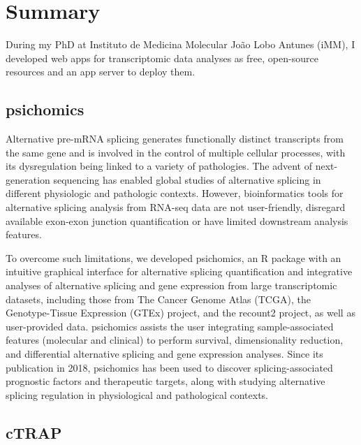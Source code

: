 \chapter*{Summary}

During my PhD at Instituto de Medicina Molecular João Lobo Antunes (iMM), I developed web apps for transcriptomic data analyses as free, open-source resources and an app server to deploy them.

\section*{psichomics}

Alternative pre-mRNA splicing generates functionally distinct transcripts from the same gene and is involved in the control of multiple cellular processes, with its dysregulation being linked to a variety of pathologies. The advent of next-generation sequencing has enabled global studies of alternative splicing in different physiologic and pathologic contexts. However, bioinformatics tools for alternative splicing analysis from RNA-seq data are not user-friendly, disregard available exon-exon junction quantification or have limited downstream analysis features.

To overcome such limitations, we developed psichomics, an R package with an intuitive graphical interface for alternative splicing quantification and integrative analyses of alternative splicing and gene expression from large transcriptomic datasets, including those from The Cancer Genome Atlas (TCGA), the Genotype-Tissue Expression (GTEx) project, and the recount2 project, as well as user-provided data. psichomics assists the user integrating sample-associated features (molecular and clinical) to perform survival, dimensionality reduction, and differential alternative splicing and gene expression analyses. Since its publication in 2018, psichomics has been used to discover splicing-associated prognostic factors and therapeutic targets, along with studying alternative splicing regulation in physiological and pathological contexts.

\section*{cTRAP}


